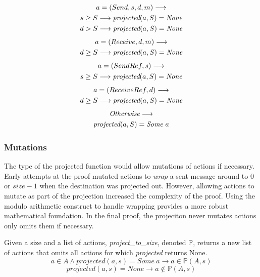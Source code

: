\documentclass[runningheads]{llncs}
\newcommand{\projectsize}[2]{\mathds{P}(#1, #2)}
\begin{document}
\begin{definition}[projected]
\begin{multline*}
a = (Send, s, d, m) \longrightarrow \\
s \ge S \longrightarrow \emph{projected}(a, S) = \emph{None} \\
d > S \longrightarrow \emph{projected}(a, S) = \emph{None} \\
\end{multline*}
\begin{multline*}
a = (Receive, d, m) \longrightarrow \\
d \ge S \longrightarrow \emph{projected}(a, S) = \emph{None} \\
\end{multline*}
\begin{multline*}
a = (SendRef, s) \longrightarrow \\
s \ge S \longrightarrow \emph{projected}(a, S) = \emph{None} \\
\end{multline*}
\begin{multline*}
a = (ReceiveRef, d) \longrightarrow \\
d \ge S \longrightarrow \emph{projected}(a, S) = \emph{None} \\
\end{multline*}
\begin{multline*}
\emph{Otherwise} \longrightarrow \\
\emph{projected}(a, S) = \emph{Some}\ a\\
\end{multline*}
\end{definition}


\subsubsection{Mutations}
The type of the projected function would allow mutations of actions if necessary. Early attempts at the proof mutated actions to \emph{wrap} a sent message around to $0$ or $size-1$ when the destination was projected out. However, allowing actions to mutate as part of the projection increased the complexity of the proof. Using the modulo arithmetic construct to handle wrapping provides a more robust mathematical foundation. In the final proof, the projeciton never mutates actions only omits them if necessary. 

\begin{definition}
Given a size and a list of actions, \emph{project\_to\_size}, denoted $\mathds{P}$, returns a new list of actions that omits all actions for which \emph{projected} returns None. 
$$
a \in A \wedge projected(a, s) = Some\ a \longrightarrow a \in \projectsize{A}{s}
$$
$$
projected(a, s) = None \longrightarrow a \notin \projectsize{A}{s}
$$
\end{definition}
\end{document}
